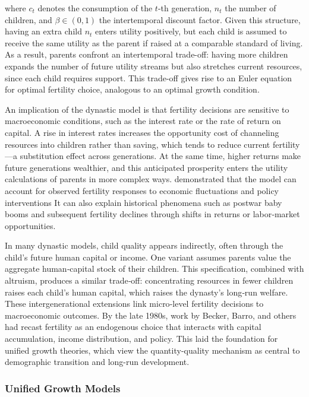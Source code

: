 \documentclass[]{AEA}
\begin{document}
where \(c_t\) denotes the consumption of the \(t\)-th generation,
\(n_t\) the number of children, and \(\beta \in (0,1)\) the
intertemporal discount factor. Given this structure, having an extra
child \(n_t\) enters utility positively, but each child is assumed to
receive the same utility as the parent if raised at a comparable
standard of living. As a result, parents confront an intertemporal
trade-off: having more children expands the number of future utility
streams but also stretches current resources, since each child requires
support. This trade-off gives rise to an Euler equation for optimal
fertility choice, analogous to an optimal growth condition.

An implication of the dynastic model is that fertility decisions are
sensitive to macroeconomic conditions, such as the interest rate or the
rate of return on capital. A rise in interest rates increases the
opportunity cost of channeling resources into children rather than
saving, which tends to reduce current fertility---a substitution effect
across generations. At the same time, higher returns make future
generations wealthier, and this anticipated prosperity enters the
utility calculations of parents in more complex ways.
\citet{barro1989fertility} demonstrated that the model can account for
observed fertility responses to economic fluctuations and policy
interventions It can also explain historical phenomena such as postwar
baby booms and subsequent fertility declines through shifts in returns
or labor‐market opportunities.

In many dynastic models, child quality appears indirectly, often through
the child's future human capital or income. One variant assumes parents
value the aggregate human‐capital stock of their children. This
specification, combined with altruism, produces a similar trade‐off:
concentrating resources in fewer children raises each child's human
capital, which raises the dynasty's long‐run welfare. These
intergenerational extensions link micro‐level fertility decisions to
macroeconomic outcomes. By the late 1980s, work by Becker, Barro, and
others had recast fertility as an endogenous choice that interacts with
capital accumulation, income distribution, and policy. This laid the
foundation for unified growth theories, which view the quantity-quality
mechanism as central to demographic transition and long-run development.

\subsubsection{Unified Growth Models}
\end{document}

